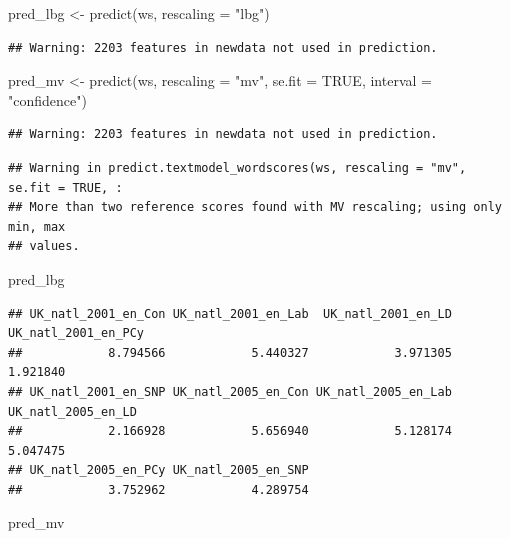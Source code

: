 \documentclass[
]{article}
\newenvironment{Shaded}{\begin{snugshade}}{\end{snugshade}}
\newcommand{\AttributeTok}[1]{\textcolor[rgb]{0.77,0.63,0.00}{#1}}
\newcommand{\ConstantTok}[1]{\textcolor[rgb]{0.00,0.00,0.00}{#1}}
\newcommand{\FunctionTok}[1]{\textcolor[rgb]{0.00,0.00,0.00}{#1}}
\newcommand{\NormalTok}[1]{#1}
\newcommand{\OtherTok}[1]{\textcolor[rgb]{0.56,0.35,0.01}{#1}}
\newcommand{\StringTok}[1]{\textcolor[rgb]{0.31,0.60,0.02}{#1}}
\begin{document}
\begin{Shaded}
\begin{Highlighting}[]
\NormalTok{pred\_lbg }\OtherTok{\textless{}{-}} \FunctionTok{predict}\NormalTok{(ws, }\AttributeTok{rescaling =} \StringTok{"lbg"}\NormalTok{)}
\end{Highlighting}
\end{Shaded}

\begin{verbatim}
## Warning: 2203 features in newdata not used in prediction.
\end{verbatim}

\begin{Shaded}
\begin{Highlighting}[]
\NormalTok{pred\_mv }\OtherTok{\textless{}{-}} \FunctionTok{predict}\NormalTok{(ws, }\AttributeTok{rescaling =} \StringTok{"mv"}\NormalTok{, }\AttributeTok{se.fit =} \ConstantTok{TRUE}\NormalTok{, }\AttributeTok{interval =} \StringTok{"confidence"}\NormalTok{)}
\end{Highlighting}
\end{Shaded}

\begin{verbatim}
## Warning: 2203 features in newdata not used in prediction.
\end{verbatim}

\begin{verbatim}
## Warning in predict.textmodel_wordscores(ws, rescaling = "mv", se.fit = TRUE, :
## More than two reference scores found with MV rescaling; using only min, max
## values.
\end{verbatim}

\begin{Shaded}
\begin{Highlighting}[]
\NormalTok{pred\_lbg}
\end{Highlighting}
\end{Shaded}

\begin{verbatim}
## UK_natl_2001_en_Con UK_natl_2001_en_Lab  UK_natl_2001_en_LD UK_natl_2001_en_PCy 
##            8.794566            5.440327            3.971305            1.921840 
## UK_natl_2001_en_SNP UK_natl_2005_en_Con UK_natl_2005_en_Lab  UK_natl_2005_en_LD 
##            2.166928            5.656940            5.128174            5.047475 
## UK_natl_2005_en_PCy UK_natl_2005_en_SNP 
##            3.752962            4.289754
\end{verbatim}

\begin{Shaded}
\begin{Highlighting}[]
\NormalTok{pred\_mv}
\end{Highlighting}
\end{Shaded}
\end{document}
